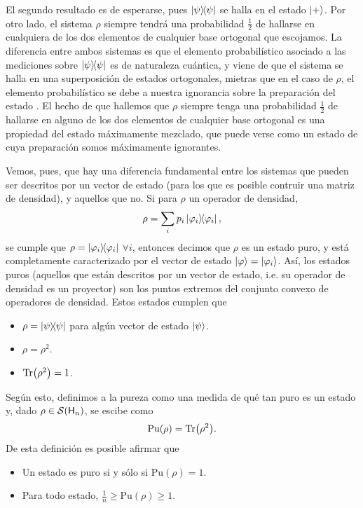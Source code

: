El segundo resultado es de esperarse, pues $\dyad{\psi}$ se halla en el estado $\ket{+}$. Por otro lado, el sistema $\rho$ siempre tendrá una probabilidad $\frac{1}{2}$ de hallarse en cualquiera de los dos elementos de cualquier base ortogonal que escojamos. La diferencia entre ambos sistemas es que el elemento probabilístico asociado a las mediciones sobre $\dyad{\psi}$ es de naturaleza cuántica, y viene de que el sistema se halla en una superposición de estados ortogonales, mietras que en el caso de $\rho$, el elemento probabilístico se debe a nuestra ignorancia sobre la preparación del estado \cite{Chuang}. El hecho de que hallemos que $\rho$ siempre tenga una probabilidad $\frac{1}{2}$ de hallarse en alguno de los dos elementos de cualquier base ortogonal es una propiedad del estado máximamente mezclado, que puede verse como un estado de cuya preparación somos máximamente ignorantes.

Vemos, pues, que hay una diferencia fundamental entre los sistemas que pueden ser descritos por un vector de estado (para los que es posible contruir una matriz de densidad), y aquellos que no. Si para $\rho$ un operador de densidad,
\begin{equation*}
    \rho=\sum_{i}p_{i}\dyad{\varphi_{i}},
\end{equation*}
se cumple que $\rho=\dyad{\varphi_{i}}$ $\forall i$, entonces decimos que $\rho$ es un estado puro, y está completamente caracterizado por el vector de estado $\ket{\varphi}=\ket{\varphi_{i}}$. Así, los estados puros (aquellos que están descritos por un vector de estado, i.e. su operador de densidad es un proyector) son los puntos extremos del conjunto convexo de operadores de densidad. Estos estados cumplen que
\begin{itemize}
    \item $\rho=\dyad{\psi}$ para algún vector de estado $\ket{\psi}$.
    \item $\rho=\rho^{2}$.
    \item $\Tr(\rho^{2})=1$.
\end{itemize}
Según esto, definimos a la pureza como una medida de qué tan puro es un estado y, dado $\rho\in\mathcal{S}({\sf H}_{n})$, se escibe como \cite{Jaeger}
\begin{equation*}
    \text{Pu}(\rho)=\Tr(\rho^{2}).
\end{equation*}
De esta definición es posible afirmar que
\begin{itemize}
    \item Un estado es puro si y sólo si $\text{Pu}(\rho)=1$.
    \item Para todo estado, $\frac{1}{n}\geq \text{Pu}(\rho)\geq 1$.
\end{itemize}



